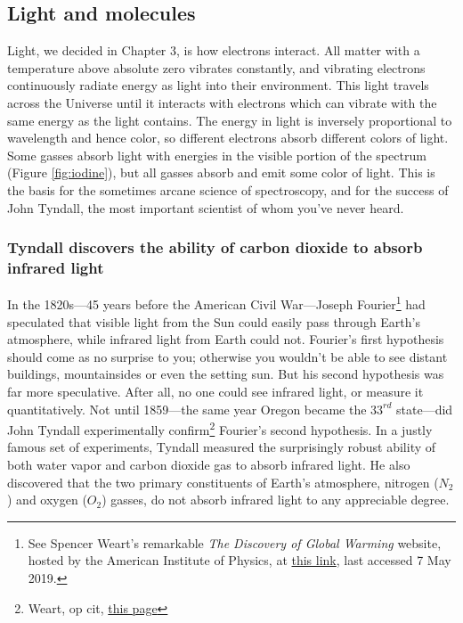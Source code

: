 \subsection{Light and molecules}
Light, we decided in Chapter 3, is how electrons interact. All matter with a temperature above absolute zero vibrates constantly, and vibrating electrons continuously radiate energy as light into their environment. This light travels across the Universe until it interacts with electrons which can vibrate with the same energy as the light contains. The energy in light is inversely proportional to wavelength and hence color, so different electrons absorb different colors of light. Some gasses absorb light with energies in the visible portion of the spectrum (Figure \ref{fig:iodine}), but all gasses absorb and emit some color of light. This is the basis for the sometimes arcane science of spectroscopy, and for the success of John Tyndall, the most important scientist of whom you've never heard.\\ 
\subsubsection{Tyndall discovers the ability of carbon dioxide to absorb infrared light} \label{tyndal}
In the 1820s---45 years before the American Civil War---Joseph Fourier\footnote{See Spencer Weart's remarkable \textit{The Discovery of Global Warming} website, hosted by the American Institute of Physics, at \href{https://history.aip.org/climate/index.htm}{this link}, last accessed 7 May 2019.} had speculated that visible light from the Sun could easily pass through Earth's atmosphere, while infrared light from Earth could not. Fourier's first hypothesis should come as no surprise to you; otherwise you wouldn't be able to see distant buildings, mountainsides or even the setting sun. But his second hypothesis was far more speculative. After all, no one could see infrared light, or measure it quantitatively. Not until 1859---the same year Oregon became the $33^{rd}$ state---did John Tyndall experimentally confirm\footnote{Weart, op cit, \href{http://www.aip.org/history/climate/co2.htm}{this page}} Fourier's second hypothesis. In a justly famous set of experiments, Tyndall measured the surprisingly robust ability of both water vapor and carbon dioxide gas to absorb infrared light. He also discovered that the two primary constituents of Earth's atmosphere, nitrogen ($N_2$) and oxygen ($O_2$) gasses, do not absorb infrared light to any appreciable degree.\\

